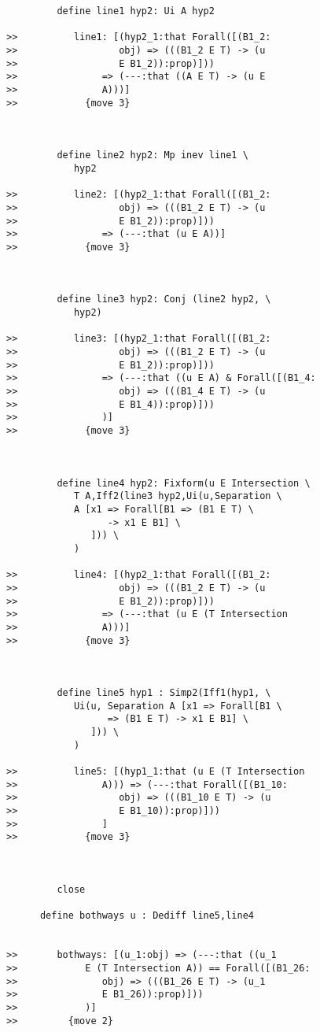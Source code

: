\documentclass[12pt]{article}
\begin{document}
\begin{verbatim}
         define line1 hyp2: Ui A hyp2

>>          line1: [(hyp2_1:that Forall([(B1_2:
>>                  obj) => (((B1_2 E T) -> (u
>>                  E B1_2)):prop)]))
>>               => (---:that ((A E T) -> (u E
>>               A)))]
>>            {move 3}



         define line2 hyp2: Mp inev line1 \
            hyp2

>>          line2: [(hyp2_1:that Forall([(B1_2:
>>                  obj) => (((B1_2 E T) -> (u
>>                  E B1_2)):prop)]))
>>               => (---:that (u E A))]
>>            {move 3}



         define line3 hyp2: Conj (line2 hyp2, \
            hyp2)

>>          line3: [(hyp2_1:that Forall([(B1_2:
>>                  obj) => (((B1_2 E T) -> (u
>>                  E B1_2)):prop)]))
>>               => (---:that ((u E A) & Forall([(B1_4:
>>                  obj) => (((B1_4 E T) -> (u
>>                  E B1_4)):prop)]))
>>               )]
>>            {move 3}



         define line4 hyp2: Fixform(u E Intersection \
            T A,Iff2(line3 hyp2,Ui(u,Separation \
            A [x1 => Forall[B1 => (B1 E T) \
                  -> x1 E B1] \
               ])) \
            )

>>          line4: [(hyp2_1:that Forall([(B1_2:
>>                  obj) => (((B1_2 E T) -> (u
>>                  E B1_2)):prop)]))
>>               => (---:that (u E (T Intersection
>>               A)))]
>>            {move 3}



         define line5 hyp1 : Simp2(Iff1(hyp1, \
            Ui(u, Separation A [x1 => Forall[B1 \
                  => (B1 E T) -> x1 E B1] \
               ])) \
            )

>>          line5: [(hyp1_1:that (u E (T Intersection
>>               A))) => (---:that Forall([(B1_10:
>>                  obj) => (((B1_10 E T) -> (u
>>                  E B1_10)):prop)]))
>>               ]
>>            {move 3}



         close

      define bothways u : Dediff line5,line4


>>       bothways: [(u_1:obj) => (---:that ((u_1
>>            E (T Intersection A)) == Forall([(B1_26:
>>               obj) => (((B1_26 E T) -> (u_1
>>               E B1_26)):prop)]))
>>            )]
>>         {move 2}




\end{verbatim}
\end{document}
